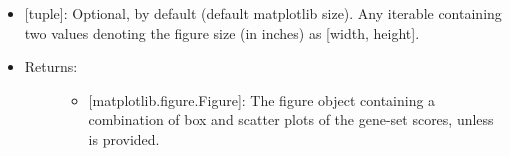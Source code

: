 \documentclass[letterpaper,10pt,english]{sphinxmanual}
\begin{document}
\begin{fulllineitems}
\begin{itemize}
\begin{description}
\begin{itemize}
\item {} 
 {[}tuple{]}: Optional,  by default (default
matplotlib size). Any iterable containing two values denoting
the figure size (in inches) as {[}width, height{]}.

\end{itemize}

\end{description}

\end{itemize}
\begin{itemize}
\item {} \begin{description}
\item[{Returns:}] \leavevmode\begin{itemize}
\item {} 
{[}matplotlib.figure.Figure{]}: The figure object containing a
combination of box and scatter plots of the gene-set scores,
unless  is provided.

\end{itemize}

\end{description}

\end{itemize}

\end{fulllineitems}

\end{document}
